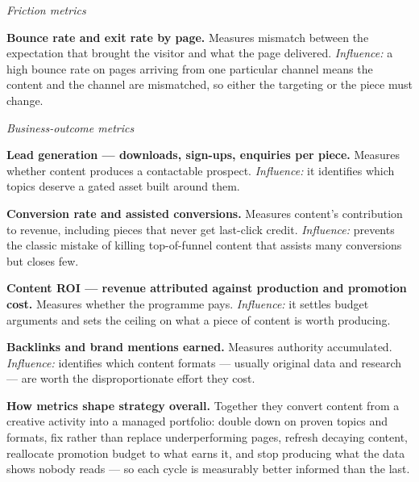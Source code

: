 \begin{qlist}
\textit{Friction metrics}
\begin{apts}\setcounter{enumi}{4}
\item \textbf{Bounce rate and exit rate by page.} Measures mismatch between the
      expectation that brought the visitor and what the page delivered.
      \emph{Influence:} a high bounce rate on pages arriving from one particular
      channel means the content and the channel are mismatched, so either the
      targeting or the piece must change.
\end{apts}

\textit{Business-outcome metrics}
\begin{apts}\setcounter{enumi}{5}
\item \textbf{Lead generation --- downloads, sign-ups, enquiries per piece.}
      Measures whether content produces a contactable prospect.
      \emph{Influence:} it identifies which topics deserve a gated asset built
      around them.
\item \textbf{Conversion rate and assisted conversions.} Measures content's
      contribution to revenue, including pieces that never get last-click
      credit. \emph{Influence:} prevents the classic mistake of killing
      top-of-funnel content that assists many conversions but closes few.
\item \textbf{Content ROI --- revenue attributed against production and
      promotion cost.} Measures whether the programme pays.
      \emph{Influence:} it settles budget arguments and sets the ceiling on
      what a piece of content is worth producing.
\item \textbf{Backlinks and brand mentions earned.} Measures authority
      accumulated. \emph{Influence:} identifies which content formats ---
      usually original data and research --- are worth the disproportionate
      effort they cost.
\end{apts}

\textbf{How metrics shape strategy overall.} Together they convert content from
a creative activity into a managed portfolio: double down on proven topics and
formats, fix rather than replace underperforming pages, refresh decaying
content, reallocate promotion budget to what earns it, and stop producing what
the data shows nobody reads --- so each cycle is measurably better informed than
the last.


\end{qlist}

